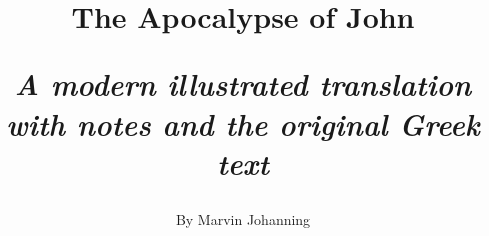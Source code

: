 \title{%
  The Apocalypse of John\\
  \begin{center}
    \textit{A modern illustrated translation with notes and the original Greek text}
  \end{center}
}
\author{By Marvin Johanning}
\date{}
\maketitle